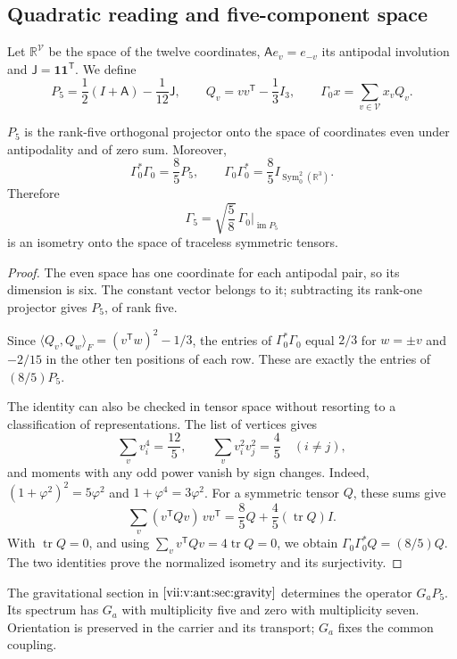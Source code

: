 \subsection{Quadratic reading and five-component space}
Let \(\mathbb R^{\mathcal V}\) be the space of the twelve coordinates,
\(\mathsf A e_v=e_{-v}\) its antipodal involution and
\(\mathsf J=\mathbf1\mathbf1^{\mathsf T}\). We define
\[
 P_5=\frac12(I+\mathsf A)-\frac1{12}\mathsf J,\qquad
 Q_v=vv^{\mathsf T}-\frac13I_3,\qquad
 \Gamma_0x=\sum_{v\in\mathcal V}x_vQ_v.
\]
\begin{theorem}
\label{vii:vii:thm:portador-pentacomponente}
\(P_5\) is the rank-five orthogonal projector onto the space of
coordinates even under antipodality and of zero sum. Moreover,
\[
 \Gamma_0^*\Gamma_0=\frac85P_5,\qquad
 \Gamma_0\Gamma_0^*=\frac85I_{\operatorname{Sym}^2_0(\mathbb R^3)}.
\]
Therefore
\[
 \Gamma_5=\sqrt{\frac58}\,\Gamma_0|_{\operatorname{im}P_5}
\]
is an isometry onto the space of traceless symmetric tensors.
\end{theorem}
\begin{proof}
The even space has one coordinate for each antipodal pair, so
its dimension is six. The constant vector belongs to it; subtracting its
rank-one projector gives \(P_5\), of rank five.

Since
\(\langle Q_v,Q_w\rangle_F=(v^{\mathsf T}w)^2-1/3\), the entries
of \(\Gamma_0^*\Gamma_0\) equal \(2/3\) for \(w=\pm v\) and
\(-2/15\) in the other ten positions of each row. These are
exactly the entries of \((8/5)P_5\).

The identity can also be checked in tensor space without
resorting to a classification of representations. The list of vertices gives
\[
 \sum_vv_i^4=\frac{12}{5},\qquad
 \sum_vv_i^2v_j^2=\frac45\quad(i\ne j),
\]
and moments with any odd power vanish by sign
changes. Indeed,
\((1+\varphi^2)^2=5\varphi^2\) and \(1+\varphi^4=3\varphi^2\).
For a symmetric tensor \(Q\), these sums give
\[
 \sum_v(v^{\mathsf T}Qv)\,vv^{\mathsf T}
 =\frac85Q+\frac45(\operatorname{tr}Q)I.
\]
With \(\operatorname{tr}Q=0\), and using
\(\sum_vv^{\mathsf T}Qv=4\operatorname{tr}Q=0\), we obtain
\(\Gamma_0\Gamma_0^*Q=(8/5)Q\). The two identities prove
the normalized isometry and its surjectivity.
\end{proof}

The gravitational section in \(\ref{vii:v:ant:sec:gravity}\) determines the
operator \(G_aP_5\). Its spectrum has \(G_a\) with multiplicity
five and zero with multiplicity seven. Orientation is preserved in
the carrier and its transport; \(G_a\) fixes the common coupling.

